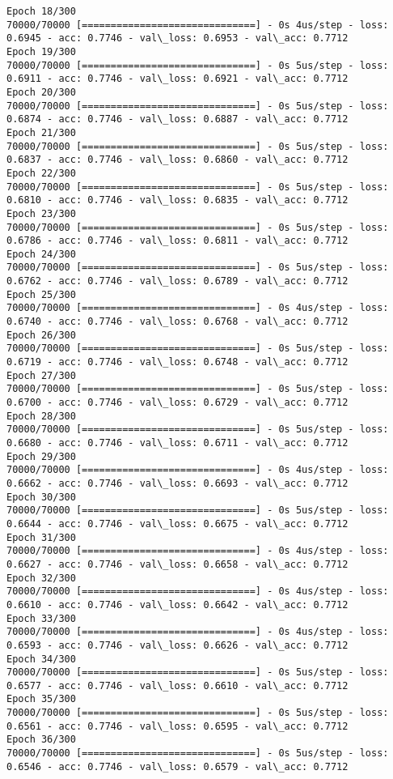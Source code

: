 \documentclass[11pt]{article}
\begin{document}
\begin{Verbatim}[commandchars=\\\{\}]
Epoch 18/300
70000/70000 [==============================] - 0s 4us/step - loss: 0.6945 - acc: 0.7746 - val\_loss: 0.6953 - val\_acc: 0.7712
Epoch 19/300
70000/70000 [==============================] - 0s 5us/step - loss: 0.6911 - acc: 0.7746 - val\_loss: 0.6921 - val\_acc: 0.7712
Epoch 20/300
70000/70000 [==============================] - 0s 5us/step - loss: 0.6874 - acc: 0.7746 - val\_loss: 0.6887 - val\_acc: 0.7712
Epoch 21/300
70000/70000 [==============================] - 0s 5us/step - loss: 0.6837 - acc: 0.7746 - val\_loss: 0.6860 - val\_acc: 0.7712
Epoch 22/300
70000/70000 [==============================] - 0s 5us/step - loss: 0.6810 - acc: 0.7746 - val\_loss: 0.6835 - val\_acc: 0.7712
Epoch 23/300
70000/70000 [==============================] - 0s 5us/step - loss: 0.6786 - acc: 0.7746 - val\_loss: 0.6811 - val\_acc: 0.7712
Epoch 24/300
70000/70000 [==============================] - 0s 5us/step - loss: 0.6762 - acc: 0.7746 - val\_loss: 0.6789 - val\_acc: 0.7712
Epoch 25/300
70000/70000 [==============================] - 0s 4us/step - loss: 0.6740 - acc: 0.7746 - val\_loss: 0.6768 - val\_acc: 0.7712
Epoch 26/300
70000/70000 [==============================] - 0s 5us/step - loss: 0.6719 - acc: 0.7746 - val\_loss: 0.6748 - val\_acc: 0.7712
Epoch 27/300
70000/70000 [==============================] - 0s 5us/step - loss: 0.6700 - acc: 0.7746 - val\_loss: 0.6729 - val\_acc: 0.7712
Epoch 28/300
70000/70000 [==============================] - 0s 5us/step - loss: 0.6680 - acc: 0.7746 - val\_loss: 0.6711 - val\_acc: 0.7712
Epoch 29/300
70000/70000 [==============================] - 0s 4us/step - loss: 0.6662 - acc: 0.7746 - val\_loss: 0.6693 - val\_acc: 0.7712
Epoch 30/300
70000/70000 [==============================] - 0s 5us/step - loss: 0.6644 - acc: 0.7746 - val\_loss: 0.6675 - val\_acc: 0.7712
Epoch 31/300
70000/70000 [==============================] - 0s 4us/step - loss: 0.6627 - acc: 0.7746 - val\_loss: 0.6658 - val\_acc: 0.7712
Epoch 32/300
70000/70000 [==============================] - 0s 4us/step - loss: 0.6610 - acc: 0.7746 - val\_loss: 0.6642 - val\_acc: 0.7712
Epoch 33/300
70000/70000 [==============================] - 0s 4us/step - loss: 0.6593 - acc: 0.7746 - val\_loss: 0.6626 - val\_acc: 0.7712
Epoch 34/300
70000/70000 [==============================] - 0s 5us/step - loss: 0.6577 - acc: 0.7746 - val\_loss: 0.6610 - val\_acc: 0.7712
Epoch 35/300
70000/70000 [==============================] - 0s 5us/step - loss: 0.6561 - acc: 0.7746 - val\_loss: 0.6595 - val\_acc: 0.7712
Epoch 36/300
70000/70000 [==============================] - 0s 5us/step - loss: 0.6546 - acc: 0.7746 - val\_loss: 0.6579 - val\_acc: 0.7712

\end{Verbatim}
\end{document}
